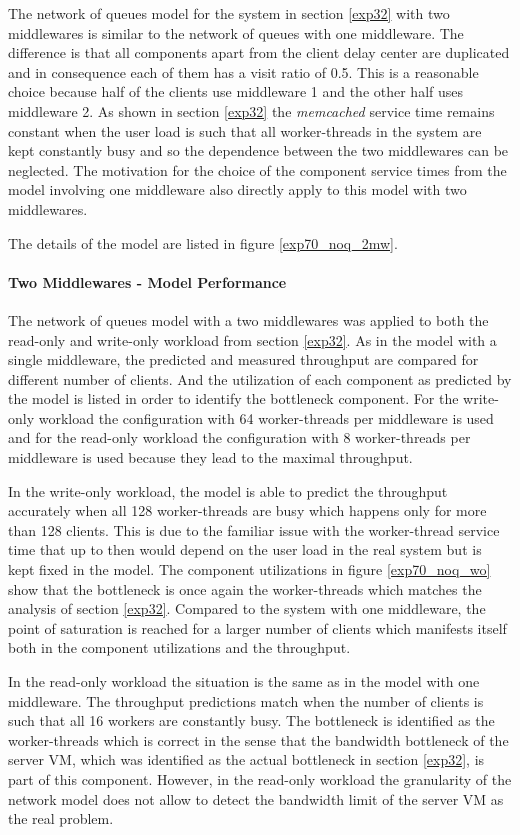 \documentclass[report.tex]{subfiles}
\begin{document}
The network of queues model for the system in section \ref{exp32} with two middlewares is similar to the network of queues with one middleware.
The difference is that all components apart from the client delay center are duplicated and in consequence each of them has a visit ratio of 0.5.
This is a reasonable choice because half of the clients use middleware 1 and the other half uses middleware 2. As shown in section \ref{exp32} the \emph{memcached} service time remains constant when the user load is such that all worker-threads in the system are kept constantly busy and so the dependence between the two middlewares can be neglected. The motivation for the choice of the component service times from the model involving one middleware also directly apply to this model with two middlewares.

The details of the model are listed in figure \ref{exp70_noq_2mw}.

\paragraph{Two Middlewares - Model Performance}
The network of queues model with a two middlewares was applied to both the read-only and write-only workload from section \ref{exp32}.
As in the model with a single middleware, the predicted and measured throughput are compared for different number of clients.
And the utilization of each component as predicted by the model is listed in order to identify the bottleneck component. For the write-only workload the configuration with 64 worker-threads per middleware is used and for the read-only workload the configuration with 8 worker-threads per middleware is used because they lead to the maximal throughput.

In the write-only workload, the model is able to predict the throughput accurately when all 128 worker-threads are busy which happens only for more than 128 clients. This is due to the familiar issue with the worker-thread service time that up to then would depend on the user load in the real system but is kept fixed in the model.
The component utilizations in figure \ref{exp70_noq_wo} show that the bottleneck is once again the worker-threads which matches the analysis of section \ref{exp32}.  Compared to the system with one middleware, the point of saturation is reached for a larger number of clients which manifests itself both in the component utilizations and the throughput.

In the read-only workload the situation is the same as in the model with one middleware. The throughput predictions match when the number of clients is such that all 16 workers are constantly busy. The bottleneck is identified as the worker-threads which is correct in the sense that the bandwidth bottleneck of the server VM, which was identified as the actual bottleneck in section \ref{exp32}, is part of this component.
However, in the read-only workload the granularity of the network model does not allow to detect the bandwidth limit of the server VM as the real problem. 
\end{document}
